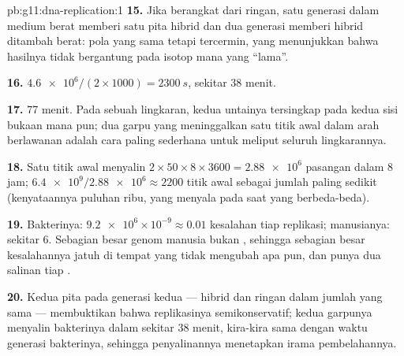 \begin{solution}{pb:g11:dna-replication:1}
\textbf{15.} Jika berangkat dari ringan, satu generasi dalam medium
berat memberi satu pita hibrid dan dua generasi memberi hibrid ditambah
berat: pola yang sama tetapi tercermin, yang menunjukkan bahwa hasilnya
tidak bergantung pada isotop mana yang ``lama''.

\textbf{16.} $\num{4.6e6}/(2 \times 1000) = \qty{2300}{s}$, sekitar
38 menit.

\textbf{17.} 77 menit. Pada sebuah lingkaran, kedua untainya
tersingkap pada kedua sisi bukaan mana pun; dua garpu yang
meninggalkan satu titik awal dalam arah berlawanan adalah cara
paling sederhana untuk meliput seluruh lingkarannya.

\textbf{18.} Satu titik awal menyalin $2 \times 50 \times 8 \times 3600 =
\num{2.88e6}$ pasangan  dalam 8 jam; $\num{6.4e9}/\num{2.88e6}
\approx 2200$ titik awal sebagai jumlah paling sedikit (kenyataannya
puluhan ribu, yang menyala pada saat yang berbeda-beda).

\textbf{19.} Bakterinya: $\num{9.2e6} \times 10^{-9} \approx 0.01$
kesalahan tiap replikasi;  manusianya: sekitar 6. Sebagian besar
genom manusia bukan , sehingga sebagian besar kesalahannya jatuh di
tempat yang tidak mengubah apa pun, dan  punya dua salinan tiap .

\textbf{20.} Kedua pita pada generasi kedua --- hibrid dan ringan dalam
jumlah yang sama --- membuktikan bahwa replikasinya semikonservatif;
kedua garpunya menyalin  bakterinya dalam sekitar 38 menit,
kira-kira sama dengan waktu generasi bakterinya, sehingga penyalinannya
menetapkan irama pembelahannya.
\end{solution}

